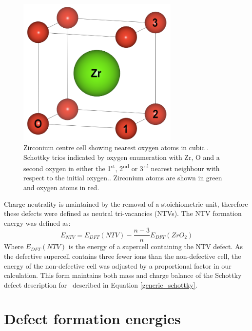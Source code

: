 \begin{figure}[ht] %
\centering
\includegraphics[width=8cm]{images/sd_cubic_zro2.png}
\caption{Zirconium centre cell showing nearest oxygen atoms in cubic \zirconia. Schottky trios indicated by oxygen enumeration with Zr, O and a second oxygen in either the 1\textsuperscript{st}, 2\textsuperscript{nd} or 3\textsuperscript{rd} nearest neighbour with respect to the initial oxygen.. Zirconium atoms are shown in green and oxygen atoms in red.}
\label{figure:cubicschottky}
\end{figure}

Charge neutrality is maintained by the removal of a stoichiometric unit, therefore these defects were defined as neutral tri-vacancies (NTVs). The NTV formation energy was defined as:
\begin{equation}
\label{equation_NTV}
E_{NTV} = E_{DFT}(NTV) - \frac{n-3}{n}E_{DFT}(ZrO_2)%
\end{equation}
Where $E_{DFT}(NTV)$ is the energy of a supercell containing the NTV defect. As the defective supercell contains three fewer ions than the non-defective cell, the energy of the non-defective cell was adjusted by a proportional factor in our calculation. This form maintains both mass and charge balance of the Schottky defect description for \zirconia\ described in Equation \ref{generic_schottky}.

\section{Defect formation energies} \label{dis_form_energy_intrinsic}

